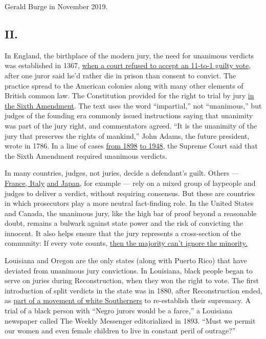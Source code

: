 Gerald Burge in November 2019.

\hypertarget{ii}{%
\subsection{II.}\label{ii}}

In England, the birthplace of the modern jury, the need for unanimous
verdicts was established in 1367,
\href{https://www.supremecourt.gov/DocketPDF/18/18-5924/103406/20190618182217707_No\%2018-5924\%20Ramos\%20v\%20\%20Louisiana\%20tsac\%20amicus\%20brief.pdf}{when
a court refused to accept an 11-to-1 guilty vote}, after one juror said
he'd rather die in prison than consent to convict. The practice spread
to the American colonies along with many other elements of British
common law. The Constitution provided for the right to trial by jury
\href{https://constitutioncenter.org/interactive-constitution/amendment/amendment-vi}{in
the Sixth Amendment}. The text uses the word ``impartial,'' not
``unanimous,'' but judges of the founding era commonly issued
instructions saying that unanimity was part of the jury right, and
commentators agreed. ``It is the unanimity of the jury that preserves
the rights of mankind,'' John Adams, the future president, wrote in
1786. In a line of cases
\href{https://supreme.justia.com/cases/federal/us/170/343/}{from 1898}
\href{https://supreme.justia.com/cases/federal/us/333/740/}{to 1948},
the Supreme Court said that the Sixth Amendment required unanimous
verdicts.

In many countries, judges, not juries, decide a defendant's guilt.
Others ---
\href{https://ir.lawnet.fordham.edu/cgi/viewcontent.cgi?article=1084\&context=faculty_scholarship}{France,
Italy}
\href{https://academic.oup.com/ssjj/article-abstract/19/1/116/2451767?redirectedFrom=fulltext}{and
Japan}, for example --- rely on a mixed group of laypeople and judges to
deliver a verdict, without requiring consensus. But these are countries
in which prosecutors play a more neutral fact-finding role. In the
United States and Canada, the unanimous jury, like the high bar of proof
beyond a reasonable doubt, remains a bulwark against state power and the
risk of convicting the innocent. It also helps ensure that the jury
represents a cross-section of the community: If every vote counts,
\href{https://www.law.cornell.edu/supremecourt/text/406/356\#writing-USSC_CR_0406_0356_ZD1}{then
the majority can't ignore the minority.}

Louisiana and Oregon are the only states (along with Puerto Rico) that
have deviated from unanimous jury convictions. In Louisiana, black
people began to serve on juries during Reconstruction, when they won the
right to vote. The first introduction of split verdicts in the state was
in 1880, after Reconstruction ended, as
\href{https://www.washingtonpost.com/opinions/these-jury-systems-are-vestiges-of-white-supremacy/2017/09/22/d7f1897a-9f13-11e7-9c8d-cf053ff30921_story.html}{part
of a movement of white Southerners} to re-establish their supremacy. A
trial of a black person with ``Negro jurors would be a farce,'' a
Louisiana newspaper called The Weekly Messenger editorialized in 1893.
``Must we permit our women and even female children to live in constant
peril of outrage?''

